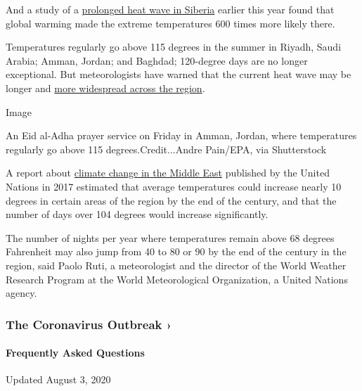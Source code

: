 And a study of a
\href{https://www.nytimes.com/2020/07/15/climate/siberia-heat-wave-climate-change.html}{prolonged
heat wave in Siberia} earlier this year found that global warming made
the extreme temperatures 600 times more likely there.

Temperatures regularly go above 115 degrees in the summer in Riyadh,
Saudi Arabia; Amman, Jordan; and Baghdad; 120-degree days are no longer
exceptional. But meteorologists have warned that the current heat wave
may be longer and
\href{https://public.wmo.int/en/media/news/above-normal-temperatures-likely-over-arab-region}{more
widespread across the region}.

Image

An Eid al-Adha prayer service on Friday in Amman, Jordan, where
temperatures regularly go above 115 degrees.Credit...Andre Pain/EPA, via
Shutterstock

A report about
\href{https://www.unescwa.org/sites/www.unescwa.org/files/events/files/riccar_main_report_2017.pdf}{climate
change in the Middle East} published by the United Nations in 2017
estimated that average temperatures could increase nearly 10 degrees in
certain areas of the region by the end of the century, and that the
number of days over 104 degrees would increase significantly.

The number of nights per year where temperatures remain above 68 degrees
Fahrenheit may also jump from 40 to 80 or 90 by the end of the century
in the region, said Paolo Ruti, a meteorologist and the director of the
World Weather Research Program at the World Meteorological Organization,
a United Nations agency.

\href{https://www.nytimes.com/news-event/coronavirus?action=click\&pgtype=Article\&state=default\&region=MAIN_CONTENT_3\&context=storylines_faq}{}

\hypertarget{the-coronavirus-outbreak-}{%
\subsubsection{The Coronavirus Outbreak
›}\label{the-coronavirus-outbreak-}}

\hypertarget{frequently-asked-questions}{%
\paragraph{Frequently Asked
Questions}\label{frequently-asked-questions}}

Updated August 3, 2020

